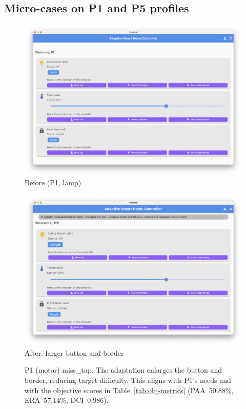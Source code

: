 \documentclass[openany]{book}
\begin{document}
\subsection{Micro-cases on P1 and P5 profiles}
\begin{figure}[H]
\centering
\begin{minipage}{0.48\textwidth}
  \includegraphics[width=\linewidth]{images/microcase_p1_before.png}\\[-0.5em]
  \centering\small Before (P1, lamp)
\end{minipage}\hfill
\begin{minipage}{0.48\textwidth}
  \includegraphics[width=\linewidth]{images/microcase_p1_after.png}\\[-0.5em]
  \centering\small After: larger button and border
\end{minipage}
\caption{P1 (motor) miss\_tap. The adaptation enlarges the button and border, reducing target difficulty. This aligns with P1’s needs and with the objective scores in Table~\ref{tab:obj-metrics} (PAA~50.88\%, ERA~57.14\%, DCI~0.986).}
\label{fig:micro-p1}
\end{figure}
\end{document}
